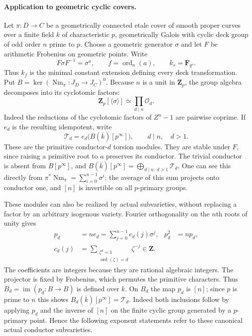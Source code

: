 \paragraph{Application to geometric cyclic covers.}
Let $\pi:D\to C$ be a geometrically connected etale cover of
smooth proper curves over a finite field $k$ of characteristic
$p$, geometrically Galois with cyclic deck group of odd order
$n$ prime to $p$.  Choose a geometric generator $\sigma$ and let $F$ be
arithmetic Frobenius on geometric points.  Write
\[
                 F\sigma F^{-1}=\sigma^a,
       \qquad f=\operatorname{ord}_n(a),\qquad k_s=\mathbf F_{q^s}.
 \tag{SD.7}
\]
Thus $k_f$ is the minimal constant extension defining every
deck transformation.  Put
$B=\ker(\operatorname{Nm}_\pi:J_D\to J_C)^0$.
Because $n$ is a unit in $\mathbf Z_p$, the group algebra
decomposes into its cyclotomic factors:
\[
 \mathbf Z_p[\langle\sigma\rangle]
       \simeq\prod_{d\mid n}\mathcal O_d.
 \tag{SD.8}
\]
Indeed the reductions of the cyclotomic factors of $Z^n-1$
are pairwise coprime.  If $e_d$ is the resulting idempotent,
write
\[
 \mathscr T_d=e_d\bigl(B(\overline k)[p^\infty]\bigr),
              \qquad d\mid n,\quad d>1.
 \tag{SD.9}
\]
These are the primitive conductor-$d$ torsion modules.  They
are stable under $F$, since raising a primitive root to $a$
preserves its conductor.  The trivial conductor is absent
from $B[p^\infty]$, and
$B(\overline k)[p^\infty]=\bigoplus_{d\mid n,\ d>1}\mathscr T_d$.
One can see this directly from
$\pi^*\operatorname{Nm}_\pi=\sum_{i=0}^{n-1}\sigma^i$:
the average of this sum projects onto conductor one, and
$[n]$ is invertible on all $p$-primary groups.

These modules can also be realized by actual subvarieties,
without replacing a factor by an arbitrary isogenous variety.
Fourier orthogonality on the $n$th roots of unity gives
\[
 \begin{aligned}
 p_d&=ne_d=\sum_{j=0}^{n-1}c_d(j)\sigma^j,
                       &p_d^2&=np_d,\\
 c_d(j)&=\sum_{\substack{\zeta^d=1\\\operatorname{ord}(\zeta)=d}}
                         \zeta^{-j}\in\mathbf Z.
 \end{aligned}
 \tag{SD.9a}
\]
The coefficients are integers because they are rational
algebraic integers.  The projector is fixed by Frobenius,
which permutes the primitive characters.  Thus
$B_d=\operatorname{im}(p_d:B\to B)$ is defined over $k$.
On $B_d$ the map $p_d$ is $[n]$; since $p$ is prime to $n$ this shows
$B_d(\overline k)[p^\infty]=\mathscr T_d$.
Indeed both inclusions follow by applying $p_d$ and the
inverse of $[n]$ on the finite cyclic group generated by a
$p$-primary point.  Hence the following exponent statements
refer to these canonical actual conductor subvarieties.


